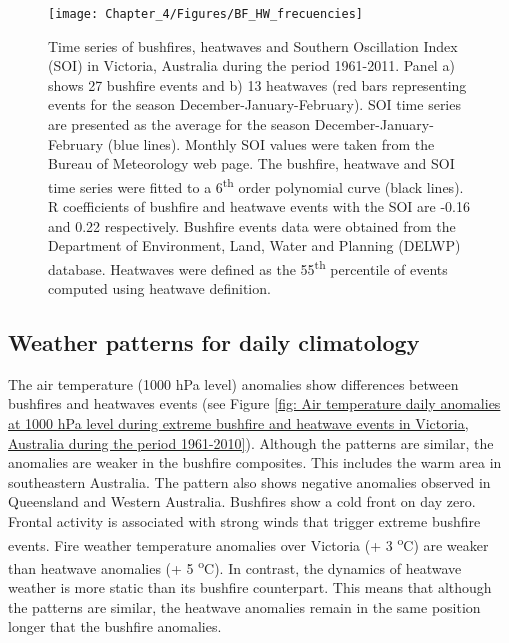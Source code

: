 \begin{figure}[h]
\noindent \begin{centering}
\texttt{[image: Chapter\_4/Figures/BF\_HW\_frecuencies]}
\par\end{centering}

\caption[Time series of bushfires, heatwaves and Southern Oscillation Index
(SOI) in Victoria, Australia during the period 1961-2011]{Time series of bushfires, heatwaves and Southern Oscillation Index
(SOI) in Victoria, Australia during the period 1961-2011. Panel a)
shows 27 bushfire events and b) 13 heatwaves (red bars representing
events for the season December-January-February). SOI time series
are presented as the average for the season December-January-February
(blue lines). Monthly SOI values were taken from the Bureau of Meteorology
web page. The bushfire, heatwave and SOI time series were fitted to
a 6\protect\textsuperscript{th} order polynomial curve (black lines).
R coefficients of bushfire and heatwave events with the SOI are -0.16
and 0.22 respectively. Bushfire events data were obtained from the
Department of Environment, Land, Water and Planning (DELWP) database.
Heatwaves were defined as the 55\protect\textsuperscript{th} percentile
of events computed using \citet{Nairn2009} heatwave definition. \label{fig:Time series of bushfires, heatwaves and Southern Oscillation Index (SOI) in Victoria, Australia during the period 1961-2011}}


\end{figure}



\subsection{Weather patterns for daily climatology }

The air temperature (1000 hPa level) anomalies show differences between
bushfires and heatwaves events (see Figure \ref{fig: Air temperature daily anomalies at 1000 hPa level during extreme bushfire and heatwave events in Victoria, Australia during the period 1961-2010}).
Although the patterns are similar, the anomalies are weaker in the
bushfire composites. This includes the warm area in southeastern Australia.
The pattern also shows negative anomalies observed in Queensland and
Western Australia. Bushfires show a cold front on day zero. Frontal activity is associated with strong winds that trigger extreme bushfire events. Fire weather
temperature anomalies over Victoria (+ 3 \textsuperscript{o}C) are
weaker than heatwave anomalies (+ 5 \textsuperscript{o}C). In contrast,
the dynamics of heatwave weather is more static than its bushfire
counterpart. This means that although the patterns are similar, the
heatwave anomalies remain in the same position longer that the bushfire
anomalies. 

